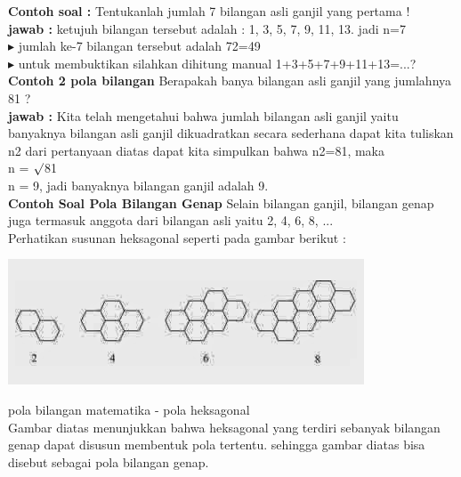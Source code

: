 \documentclass[11pt,fleqn]{book} %
\begin{document}
\textbf {Contoh soal :} 
\noindent Tentukanlah jumlah 7 bilangan asli ganjil yang pertama !\\

\textbf {jawab :}
\noindent ketujuh bilangan tersebut adalah : 1, 3, 5, 7, 9, 11, 13. jadi n=7\\
\noindent $\blacktriangleright$ jumlah ke-7 bilangan tersebut adalah 72=49\\
\noindent $\blacktriangleright$ untuk membuktikan silahkan dihitung manual 1+3+5+7+9+11+13=...?\\

\textbf {Contoh 2 pola bilangan}
\noindent Berapakah banya bilangan asli ganjil yang jumlahnya 81 ?\\

\textbf {jawab :}
\noindent Kita telah mengetahui bahwa jumlah bilangan asli ganjil yaitu banyaknya bilangan asli ganjil dikuadratkan secara sederhana dapat kita tuliskan n2 dari pertanyaan diatas dapat kita simpulkan bahwa
n2=81, maka\\
n = $\surd$81\\
n = 9, jadi banyaknya bilangan ganjil adalah 9.\\

\textbf {Contoh Soal Pola Bilangan Genap}
\noindent Selain bilangan ganjil, bilangan genap juga termasuk anggota dari bilangan asli yaitu {2, 4, 6, 8, ...}\\

Perhatikan susunan heksagonal seperti pada gambar berikut :\\
\noindent
\begin{center}
\includegraphics{Pictures/27.jpg}\\
\end{center}

\noindent pola bilangan matematika - pola heksagonal\\
\noindent  Gambar diatas menunjukkan bahwa heksagonal yang terdiri sebanyak bilangan genap dapat disusun membentuk pola tertentu. sehingga gambar diatas bisa disebut sebagai pola bilangan genap.\\
\end{document}
